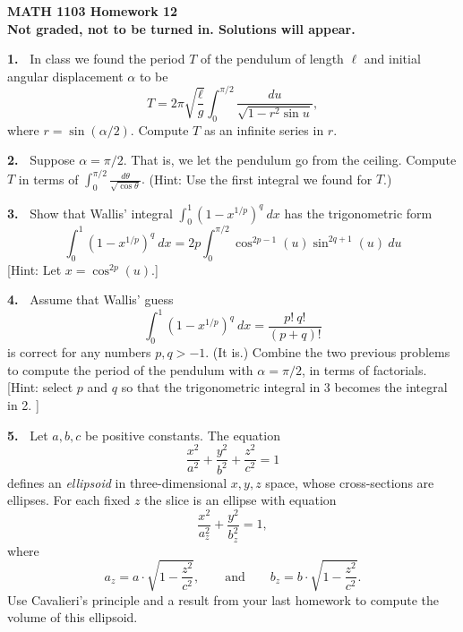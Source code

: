 \documentclass[12pt]{article}
\newcommand{\al}{\alpha}
\theoremstyle{definition}
\theoremstyle{remark}
\theoremstyle{definition}
\newenvironment{Solution}{\noindent\textbf{Solution.}}{}
\begin{document}
  

{\bf MATH 1103 Homework 12}\\
{\bf Not graded, not to be turned in. Solutions will appear.}




{\bf 1.\ } In class we found the period $T$ of the pendulum of length $\ell$ and initial angular displacement $\al$ to be 
\[T=2\pi\sqrt{\frac{\ell}{g}}\int_0^{\pi/2}\frac{du}{\sqrt{1-r^2\sin u}},
\]
where $r=\sin(\al/2)$. Compute $T$ as an infinite series in $r$. 



{\bf 2.\ } Suppose $\al=\pi/2$. That is, we let the pendulum go from the ceiling. Compute $T$ in terms of 
$\displaystyle\int_0^{\pi/2}
\frac{d\theta}{\sqrt{\cos \theta}}.
$
(Hint: Use the first integral we found for $T$.)

{\bf 3.\ } Show that Wallis' integral $\int_0^1(1-x^{1/p})^q\ dx$ 
has the trigonometric form
\[
\int_0^1(1-x^{1/p})^q\ dx=2p\int_0^{\pi/2}\cos^{2p-1}(u)\sin^{2q+1}(u)\ du
\]
[Hint: Let $x=\cos^{2p}(u)$.]

{\bf 4.\ } Assume that Wallis' guess 
\[
\int_0^1(1-x^{1/p})^q\ dx=\frac{p!\ q!}{(p+q)!}
\]
is correct for any numbers $p,q>-1$. (It is.) Combine the two previous problems to compute the period of the pendulum with $\al=\pi/2$, in terms of factorials. [Hint: select $p$ and $q$ so that the trigonometric integral in 3 becomes the integral in 2. ]


{\bf 5.\ } Let $a,b,c$ be positive constants. The equation 
\[\frac{x^2}{a^2}+\frac{y^2}{b^2}+\frac{z^2}{c^2}=1\]
defines an {\it ellipsoid} in three-dimensional $x,y,z$ space, whose  cross-sections are ellipses.
For each fixed $z$ the slice is an ellipse with equation
\[\frac{x^2}{a_z^2}+\frac{y^2}{b_z^2}=1,\]
where 
\[a_z=a\cdot\sqrt{1-\frac{z^2}{c^2}},\qquad \text{and}\qquad 
b_z=b\cdot\sqrt{1-\frac{z^2}{c^2}}.
\]
Use Cavalieri's principle and a result from your last homework to compute the volume of this ellipsoid. 
\end{document}
